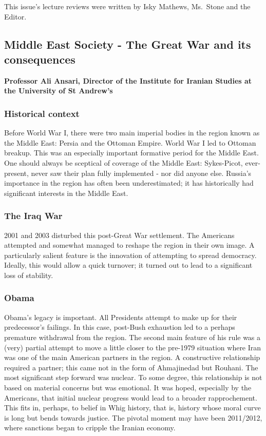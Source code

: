 This issue's lecture reviews were written by Isky Mathews, Ms.~Stone and
the Editor.

\subsection{Middle East Society - The Great War and its consequences}

\textbf{Professor Ali Ansari, Director of the Institute for Iranian Studies at
	the University of St Andrew's}



	\subsubsection{Historical context}\label{historic-context}

	Before World War I, there were two main imperial bodies in the region
	known as the Middle East: Persia and the Ottoman Empire. World War I led
	to Ottoman breakup. This was an especially important formative period
	for the Middle East. One should always be sceptical of coverage of the
	Middle East: Sykes-Picot, ever-present, never saw their plan fully
	implemented - nor did anyone else. Russia's importance in the region has
	often been underestimated; it has historically had significant interests
	in the Middle East.

	\subsubsection{The Iraq War}\label{the-iraq-war}

	2001 and 2003 disturbed this post-Great War settlement. The Americans
	attempted and somewhat managed to reshape the region in their own image.
	A particularly salient feature is the innovation of attempting to spread
	democracy. Ideally, this would allow a quick turnover; it turned out to
	lead to a significant loss of stability.

	\subsubsection{Obama}\label{obama}

	Obama's legacy is important. All Presidents attempt to make up for their
	predecessor's failings. In this case, post-Bush exhaustion led to a
	perhaps premature withdrawal from the region. The second main feature of
	his rule was a (very) partial attempt to move a little closer to the
	pre-1979 situation where Iran was one of the main American partners in
	the region. A constructive relationship required a partner; this came
	not in the form of Ahmajinedad but Rouhani. The most significant step
	forward was nuclear. To some degree, this relationship is not based on
	material concerns but was emotional. It was hoped, especially by the
	Americans, that initial nuclear progress would lead to a broader
	rapprochement. This fits in, perhaps, to belief in Whig history, that
	is, history whose moral curve is long but bends towards justice. The
	pivotal moment may have been 2011/2012, where sanctions began to cripple
	the Iranian economy.

